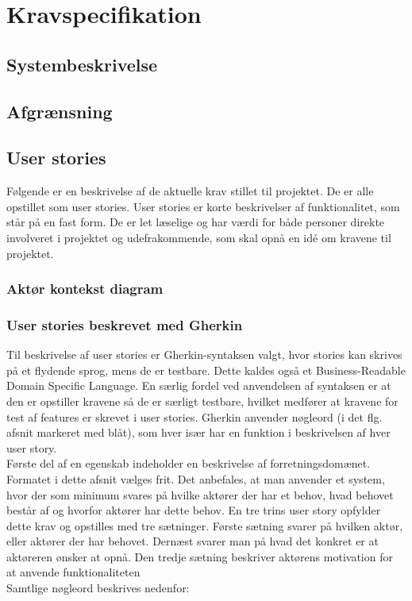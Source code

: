 	\chapter{Kravspecifikation}
	
	\section{Systembeskrivelse}
			
			
	\section{Afgrænsning}
		

\section{User stories} \label{sec:UserStories}
Følgende er en beskrivelse af de aktuelle krav stillet til projektet. De er alle opstillet som user stories. User stories er korte beskrivelser af funktionalitet, som står på en fast form. De er let læselige og har værdi for både personer direkte involveret i projektet og udefrakommende, som skal opnå en idé om kravene til projektet. 

\subsection{Aktør kontekst diagram}\label{sec:aktor}


\subsection{User stories beskrevet med Gherkin}
Til beskrivelse af user stories er Gherkin-syntaksen valgt, hvor stories 
kan skrives på et flydende sprog, mens de er testbare.\cite{Gherkin} Dette kaldes også et Business-Readable Domain  
Specific Language. En særlig fordel ved anvendelsen af syntaksen er at den er opstiller kravene så de er særligt testbare, hvilket medfører at kravene for test af features er skrevet i user stories.
Gherkin anvender nøgleord (i det flg. afsnit 
markeret med blåt), som hver især har en funktion i beskrivelsen af hver 
user story.  \vspace{0.2 cm}\\
Første del af en egenskab indeholder en beskrivelse af forretningsdomænet. 
Formatet i	dette afsnit vælges frit. Det anbefales, at man anvender et 
system, hvor der som minimum svares på hvilke aktører der har et behov, hvad 
behovet består af og hvorfor aktører har dette behov. En tre trins user 
story opfylder dette krav og opstilles med tre 
sætninger. Første sætning svarer på hvilken aktør, eller aktører der har
behovet. Dernæst svarer man på hvad det konkret er at aktøreren ønsker at 
opnå. Den tredje sætning beskriver aktørens motivation for at anvende 
funktionaliteten\\
Samtlige nøgleord beskrives nedenfor:

